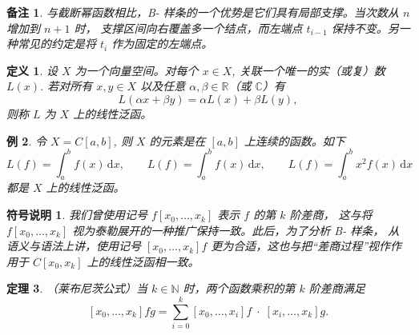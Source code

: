 \documentclass[a4paper]{ctexart}
\newtheorem{theorem}{定理}
\newtheorem{remark}{备注}
\newtheorem{notation}{符号说明}
\newtheorem{definition}[theorem]{定义} %
\newtheorem{example}[theorem]{例}
\numberwithin{theorem}{section}
\numberwithin{equation}{section}
\numberwithin{figure}{section}
\numberwithin{remark}{section}
\begin{document}
\begin{remark}
    \label{rem::local_support_advantage}
与截断幂函数相比，B- 样条的一个优势是它们具有局部支撑。当次数从 $n$ 增加到 $n+1$ 时，
支撑区间向右覆盖多一个结点，而左端点 $t_{i-1}$ 保持不变。另一种常见的约定是将 $t_i$ 作为固定的左端点。
\end{remark}

\begin{definition}
    \label{def::linear_functional}
设 $X$ 为一个向量空间。对每个 $x\in X$, 关联一个唯一的实（或复）数 $L(x)$. 
若对所有 $x,y\in X$ 以及任意 $\alpha,\beta\in\mathbb{R}$（或 $\mathbb{C}$）有
\begin{equation}
\label{eq::linear_functional_axiom}
L(\alpha x+\beta y)=\alpha L(x)+\beta L(y),
\end{equation}
则称 $L$ 为 $X$ 上的线性泛函。
\end{definition}

\begin{example}
    \label{ex::linear_functionals_on_Cab}
令 $X=C[a,b]$, 则 $X$ 的元素是在 $[a,b]$ 上连续的函数。如下
\begin{equation*}
\label{eq::functionals_examples}
L(f)=\int_{a}^{b} f(x)\,\mathrm{d}x,\qquad
L(f)=\int_{a}^{b} f(x)\,\mathrm{d}x,\qquad
L(f)=\int_{a}^{b} x^{2} f(x)\,\mathrm{d}x
\end{equation*}
都是 $X$ 上的线性泛函。
\end{example}

\begin{notation}
    \label{not::divided_diff_as_functional}
我们曾使用记号 $f[x_0,\ldots,x_k]$ 表示 $f$ 的第 $k$ 阶差商，
这与将 $f[x_0,\ldots,x_k]$ 视为泰勒展开的一种推广保持一致。此后，为了分析 B- 样条，
从语义与语法上讲，使用记号 $[x_0,\ldots,x_k]f$ 更为合适，这也与把“差商过程”视作作用于 $C[x_0,x_k]$ 上的线性泛函相一致。
\end{notation}

\begin{theorem}
    \label{thm::leibniz_divided_difference}
（莱布尼茨公式）当 $k\in\mathbb{N}$ 时，两个函数乘积的第 $k$ 阶差商满足
\begin{equation}
\label{eq::leibniz_divdiff}
[x_0,\ldots,x_k]fg=\sum_{i=0}^{k}[x_0,\ldots,x_i]f\;\cdot\;[x_i,\ldots,x_k]g.
\end{equation}
\end{theorem}
\end{document}
